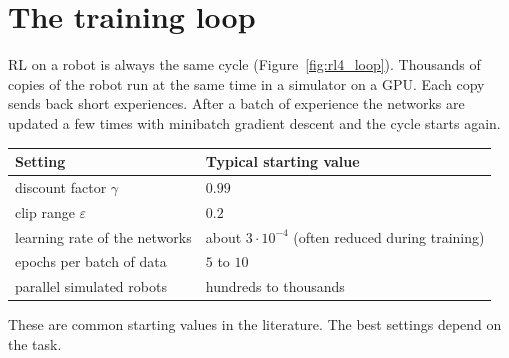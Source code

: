 \section*{The training loop}
RL on a robot is always the same cycle (Figure~\ref{fig:rl4_loop}). Thousands of copies of the robot run at the same time in a simulator on a GPU. Each copy sends back short experiences. After a batch of experience the networks are updated a few times with minibatch gradient descent and the cycle starts again.

\begin{center}
\label{fig:rl4_loop}
\end{center}

\begin{center}
\renewcommand{\arraystretch}{1.25}
\begin{tabular}{p{5cm}p{7.5cm}}
\textbf{Setting} & \textbf{Typical starting value}\\ \hline
discount factor $\gamma$ & $0.99$\\
clip range $\varepsilon$ & $0.2$\\
learning rate of the networks & about $3\cdot10^{-4}$ (often reduced during training)\\
epochs per batch of data & $5$ to $10$\\
parallel simulated robots & hundreds to thousands\\
\end{tabular}
\end{center}
These are common starting values in the literature. The best settings depend on the task.

